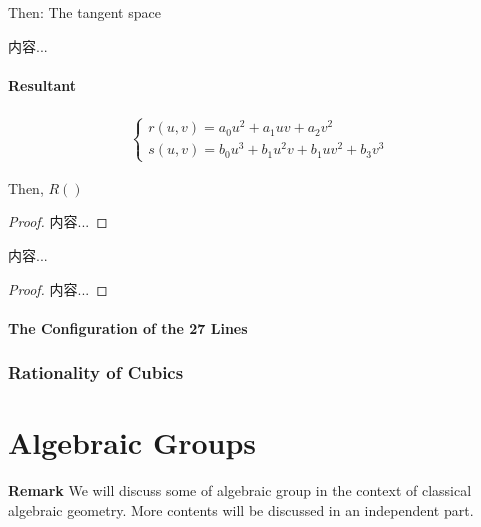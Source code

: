 \documentclass[Total.tex]{subfiles}
\begin{document}
					Then: The tangent space
					
					\begin{center}
						内容...
					\end{center}
				\subsubsection{Resultant}
				
					\begin{Def}
						\begin{gather*}
							\begin{cases}
								r(u,v)=a_0u^2+a_1uv+a_2v^2\\
								s(u,v)=b_0u^3+b_1 u^2v+b_1uv^2+b_3v^3
							\end{cases}
						\end{gather*}
						
						Then, $R()$
					\end{Def}
					
					
					
					\begin{lemma}
						
					\end{lemma}
					
					\begin{proof}
						内容...
					\end{proof}
					
					\begin{theorem}
						内容...
					\end{theorem}
					
					\begin{proof}
						内容...
					\end{proof}
					
				\subsubsection{The Configuration of the 27 Lines}
				
				
				\subsection{Rationality of Cubics}
		
	\chapter{Algebraic Groups}
	
		\textbf{Remark} We will discuss some of algebraic group in the context of classical algebraic geometry. More contents will be discussed in an independent part.
		
\end{document}
